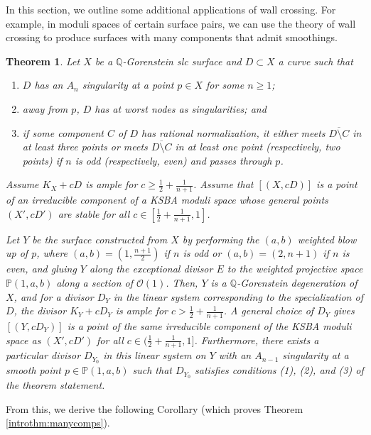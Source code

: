 \documentclass[11pt]{amsart}
\numberwithin{equation}{section}
\newtheorem{theorem}{Theorem}[section]
\theoremstyle{definition}
\newcommand{\bQ}{\mathbb{Q}}
\newcommand{\bP}{\mathbb{P}}
\newcommand{\calO}{\mathcal{O}}
\begin{document}
In this section, we outline some additional applications of wall crossing.  For example, in moduli spaces of certain surface pairs, we can use the theory of wall crossing to produce surfaces with many components that admit smoothings. 

\begin{theorem}\label{thm:manycomps}
    Let $X$ be a $\bQ$-Gorenstein slc surface and $D \subset X$ a curve such that 
        \begin{enumerate}
            \item $D$ has an $A_n$ singularity at a point $p \in X$ for some $n \ge 1$;
            \item away from $p$, $D$ has at worst nodes as singularities; and
            \item if some component $C$ of $D$ has rational normalization, it either meets $\overline{D \setminus C}$ in at least three points or meets $\overline{D \setminus C}$ in at least one point (respectively, two points) if $n$ is odd (respectively, even) and passes through $p$.
        \end{enumerate} 
    Assume $K_X + c D$ is ample for $c \ge \frac{1}{2} + \frac{1}{n+1}$.  Assume that $[(X,cD)]$ is a point of an irreducible component of a KSBA moduli space whose general points $(X',cD')$ are stable for all $c \in [\frac{1}{2}+\frac{1}{n+1},1]$.

    Let $Y$ be the surface constructed from $X$ by performing the $(a,b)$ weighted blow up of $p$, where $(a,b) =  (1,\frac{n+1}{2})$ if $n$ is odd or $(a,b) = (2, n+1)$ if $n$ is even, and gluing $Y$ along the exceptional divisor $E$ to the weighted projective space $\bP(1,a,b)$ along a section of $\calO(1)$.  Then, $Y$ is a $\bQ$-Gorenstein degeneration of $X$, and for a divisor $D_Y$ in the linear system corresponding to the specialization of $D$, the divisor $K_Y + c D_Y$ is ample for $c > \frac{1}{2} + \frac{1}{n+1}$.  A general choice of $D_Y$ gives $[(Y, cD_Y)]$ is a point of the same irreducible component of the KSBA moduli space as $(X',cD')$ for all $c \in (\frac{1}{2} + \frac{1}{n+1},1]$.  Furthermore, there exists a particular divisor $D_{Y_0}$ in this linear system on $Y$ with an $A_{n-1}$ singularity at a smooth point $p \in \bP(1,a,b)$ such that $D_{Y_0}$ satisfies conditions (1), (2), and (3) of the theorem statement.
\end{theorem}

From this, we derive the following Corollary (which proves Theorem \ref{introthm:manycomps}).
\end{document}
